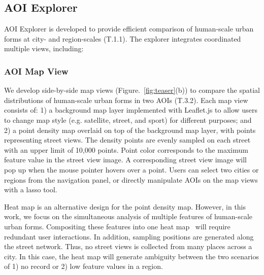 \subsection{AOI Explorer}
\label{ssec:aoi_explorer}
AOI Explorer is developed to provide efficient comparison of human-scale urban forms at city- and region-scales (T.1.1).
The explorer integrates coordinated multiple views, including:

\subsubsection{AOI Map View}
\label{sssec:aoi_map_view}

We develop side-by-side map views (Figure.~\ref{fig:teaser}(b)) to compare the spatial distributions of human-scale urban forms in two AOIs (T.3.2).
Each map view consists of:
1) a background map layer implemented with Leaflet.js to allow users to change map style (e.g. satellite, street, and sport) for different purposes;
and 2) a point density map overlaid on top of the background map layer, with points representing street views.
The density points are evenly sampled on each street with an upper limit of 10,000 points.
Point color corresponds to the maximum feature value in the street view image.
A corresponding street view image will pop up when the mouse pointer hovers over a point.
Users can select two cities or regions from the navigation panel, or directly manipulate AOIs on the map views with a lasso tool.

Heat map is an alternative design for the point density map.
However, in this work, we focus on the simultaneous analysis of multiple features of human-scale urban forms.
Compositing these features into one heat map~\cite{scheepens_2011_composite} will require redundant user interactions.
In addition, sampling positions are generated along the street network.
Thus, no street views is collected from many places across a city.
In this case, the heat map will generate ambiguity between the two scenarios of 1) no record or 2) low feature values in a region.


